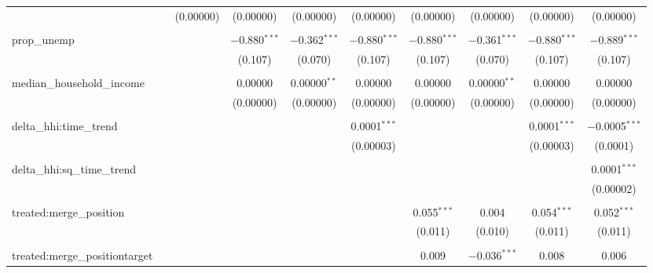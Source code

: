 \begin{table}[H]
{\begin{tabular}{@{\extracolsep{5pt}}lccccccccc}
   &  & (0.00000) & (0.00000) & (0.00000) & (0.00000) & (0.00000) & (0.00000) & (0.00000) & (0.00000) \\  

   & & & & & & & & & \\  

  prop\_unemp &  &  & $-$0.880$^{***}$ & $-$0.362$^{***}$ & $-$0.880$^{***}$ & $-$0.880$^{***}$ & $-$0.361$^{***}$ & $-$0.880$^{***}$ & $-$0.889$^{***}$ \\  

   &  &  & (0.107) & (0.070) & (0.107) & (0.107) & (0.070) & (0.107) & (0.107) \\  

   & & & & & & & & & \\  

  median\_household\_income &  &  & 0.00000 & 0.00000$^{**}$ & 0.00000 & 0.00000 & 0.00000$^{**}$ & 0.00000 & 0.00000 \\  

   &  &  & (0.00000) & (0.00000) & (0.00000) & (0.00000) & (0.00000) & (0.00000) & (0.00000) \\  

   & & & & & & & & & \\  

  delta\_hhi:time\_trend &  &  &  &  & 0.0001$^{***}$ &  &  & 0.0001$^{***}$ & $-$0.0005$^{***}$ \\  

   &  &  &  &  & (0.00003) &  &  & (0.00003) & (0.0001) \\  

   & & & & & & & & & \\  

  delta\_hhi:sq\_time\_trend &  &  &  &  &  &  &  &  & 0.0001$^{***}$ \\  

   &  &  &  &  &  &  &  &  & (0.00002) \\  

   & & & & & & & & & \\  

  treated:merge\_position &  &  &  &  &  & 0.055$^{***}$ & 0.004 & 0.054$^{***}$ & 0.052$^{***}$ \\  

   &  &  &  &  &  & (0.011) & (0.010) & (0.011) & (0.011) \\  

   & & & & & & & & & \\  

  treated:merge\_positiontarget &  &  &  &  &  & 0.009 & $-$0.036$^{***}$ & 0.008 & 0.006 \\  


\end{tabular}}
\end{table}
